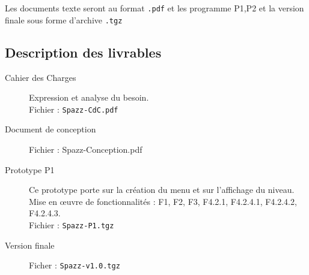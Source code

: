 \documentclass[a4paper,11pt]{article}
\begin{document}
Les documents texte seront au format \texttt{.pdf} et les programme P1,P2 et la version finale sous forme d'archive \texttt{.tgz}

\subsection{Description des livrables}

\begin{description}
	\item [Cahier des Charges]	Expression et analyse du besoin.\\
								Fichier : \texttt{Spazz-CdC.pdf}
	\item [Document de conception] Fichier : Spazz-Conception.pdf
	\item [Prototype P1] 	Ce prototype porte sur la création du menu et sur l'affichage du niveau.\\
							Mise en œuvre de fonctionnalités : F1, F2, F3, F4.2.1, F4.2.4.1, F4.2.4.2, F4.2.4.3.\\
							Fichier : \texttt{Spazz-P1.tgz}
	\item [Version finale] Ficher : \texttt{Spazz-v1.0.tgz}
\end{description}
\end{document}
